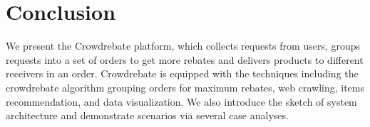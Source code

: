 \section{Conclusion} \vspace{-1ex}
\label{sec:conclusion}

We present the Crowdrebate platform, which collects requests from users, groups requests into a set of orders to get more rebates and delivers products to different receivers in an order. Crowdrebate is equipped with the techniques including the crowdrebate algorithm grouping orders for maximum rebates, web crawling, items recommendation, and data visualization. We also introduce the sketch of system architecture and demonstrate scenarios via several case analyses. 
 
 \vspace{-1ex}